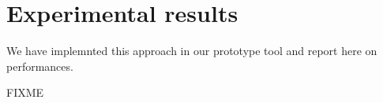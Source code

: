 \section{Experimental results}
\label{sec:perf}

We have implemnted this approach in our prototype tool and report here on performances.

\color{Red}
FIXME





\color{Black}